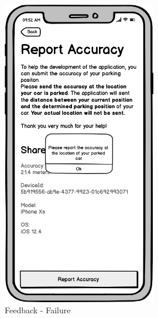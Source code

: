 \begin{figure}[h]
  \centering
  \hfill
  \begin{minipage}[b]{0.49\textwidth}
    \centering
    \includegraphics[width=0.6\textwidth]{images/UI/Iteration4-Feedback-Failure.png}
    \caption{Feedback - Failure}
    \label{fig:feedback-fail}
  \end{minipage}
  \hfill
  \begin{minipage}[b]{0.49\textwidth}
    \centering

\end{minipage}
\end{figure}
